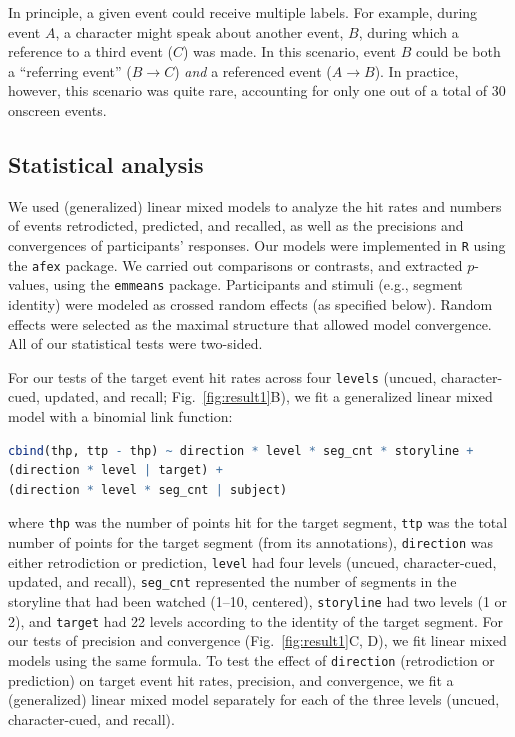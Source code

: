 \documentclass[10pt]{article}
\begin{document}
In principle, a given event could receive multiple labels. For example, during
event $A$, a character might speak about another event, $B$, during which a
reference to a third event ($C$) was made. In this scenario, event $B$ could be
both a ``referring event'' ($B \rightarrow C$) \textit{and} a referenced event
($A \rightarrow B$). In practice, however, this scenario was quite rare,
accounting for only one out of a total of 30 onscreen events.

\subsection*{Statistical analysis}

We used (generalized) linear mixed models to analyze the hit rates and numbers
of events retrodicted, predicted, and recalled, as well as the precisions and
convergences of participants' responses. Our models were implemented in
\texttt{R} using the \texttt{afex} package. We carried out comparisons or
contrasts, and extracted $p$-values, using the \texttt{emmeans} package.
Participants and stimuli (e.g., segment identity) were modeled as crossed
random effects (as specified below). Random effects were selected as the
maximal structure that allowed model convergence. All of our statistical tests
were two-sided.

For our tests of the target event hit rates across four \texttt{levels}
(uncued, character-cued, updated, and recall; Fig.~\ref{fig:result1}B), we fit
a generalized linear mixed model with a binomial link function:
\begin{lstlisting}[language=R]
  cbind(thp, ttp - thp) ~ direction * level * seg_cnt * storyline +
(direction * level | target) +
(direction * level * seg_cnt | subject)
\end{lstlisting}
where \texttt{thp} was the number of points hit for the target segment,
\texttt{ttp} was the total number of points for the target segment (from its
annotations), \texttt{direction} was either retrodiction or prediction,
\texttt{level} had four levels (uncued, character-cued, updated, and recall),
\texttt{seg\_cnt} represented the number of segments in the storyline that had
been watched (1--10, centered), \texttt{storyline} had two levels (1 or 2), and
\texttt{target} had 22 levels according to the identity of the target segment.
For our tests of precision and convergence (Fig.~\ref{fig:result1}C, D), we fit
linear mixed models using the same formula. To test the effect of
\texttt{direction} (retrodiction or prediction) on target event hit rates,
precision, and convergence, we fit a (generalized) linear mixed model
separately for each of the three levels (uncued, character-cued, and recall).
\end{document}
